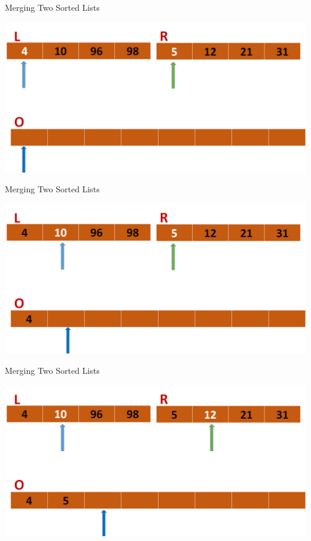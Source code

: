 \documentclass{beamer}
\begin{document}
\begin{frame}{Merging Two Sorted Lists}
\begin{center}
    \includegraphics[scale=0.4]{mergeStep1.png}
\end{center}
\end{frame}




\begin{frame}{Merging Two Sorted Lists}
\begin{center}
    \includegraphics[scale=0.4]{mergeStep2.png}
\end{center}
\end{frame}




\begin{frame}{Merging Two Sorted Lists}
\begin{center}
    \includegraphics[scale=0.4]{mergeStep3.png}
\end{center}
\end{frame}
\end{document}
